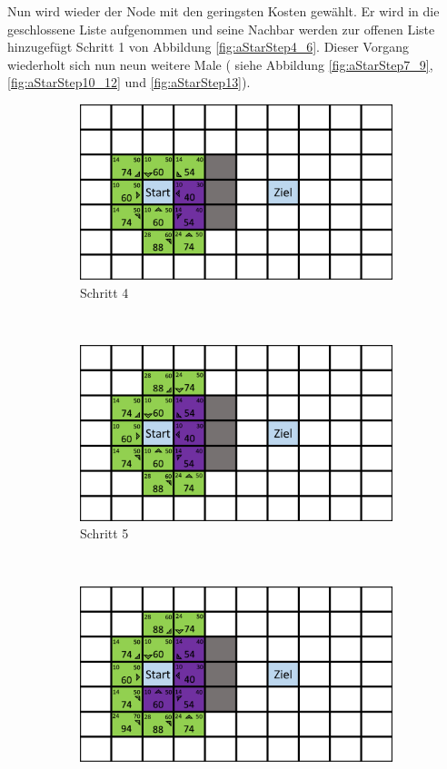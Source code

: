Nun wird wieder der Node mit den geringsten Kosten gewählt. Er wird in die geschlossene Liste aufgenommen und seine Nachbar werden zur offenen Liste hinzugefügt Schritt 1 von Abbildung \ref{fig:aStarStep4_6}. Dieser Vorgang wiederholt sich nun neun weitere Male ( siehe Abbildung \ref{fig:aStarStep7_9}, \ref{fig:aStarStep10_12} und \ref{fig:aStarStep13}). 
\begin{figure}[H]
    \centering
    \begin{subfigure}[b]{0.3\textwidth}
        \includegraphics[width=\textwidth]{assets/aStarStep3.png}
        \caption{Schritt 4}
        \label{fig:aStartStep4}
    \end{subfigure}
    ~
    \begin{subfigure}[b]{0.3\textwidth}
        \includegraphics[width=\textwidth]{assets/aStarStep4.png}
        \caption{Schritt 5}
        \label{fig:aStartStep5}
    \end{subfigure}
    ~
    \begin{subfigure}[b]{0.3\textwidth}
        \includegraphics[width=\textwidth]{assets/aStarStep5.png}

\end{subfigure}
\end{figure}

